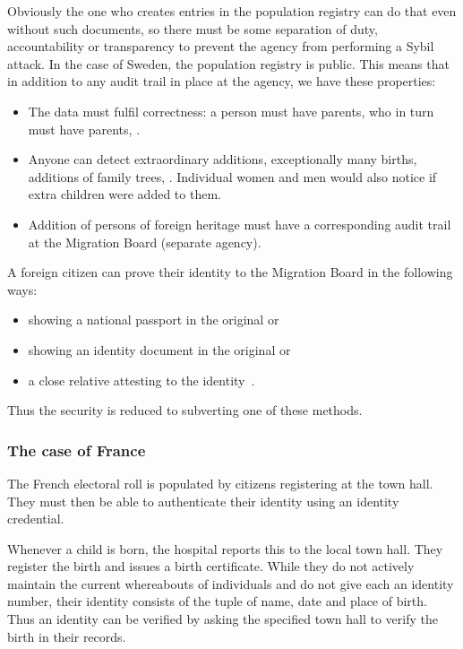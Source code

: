 Obviously the one who creates entries in the population registry can do that 
even without such documents, so there must be some separation of duty, 
accountability or transparency to prevent the agency from performing a Sybil 
attack.
In the case of Sweden, the population registry is public.
This means that in addition to any audit trail in place at the agency, we have 
these properties:
\begin{itemize}
  \item The data must fulfil correctness: a person must have parents, who in 
    turn must have parents, \etc.
  \item Anyone can detect extraordinary additions, \eg exceptionally many 
    births, additions of family trees, \etc.
    Individual women and men would also notice if extra children were added to 
    them.
  \item Addition of persons of foreign heritage must have a corresponding audit 
    trail at the Migration Board (separate agency).
\end{itemize}
A foreign citizen can prove their identity to the Migration Board in the 
following ways:
\begin{itemize}
  \item showing a national passport in the original or
  \item showing an identity document in the original or
  \item a close relative attesting to the 
    identity~\cite{Migrationsverket-ProvenIdentity}.
\end{itemize}
Thus the security is reduced to subverting one of these methods.

\subsubsection{The case of France}

The French electoral roll is populated by citizens registering at the town 
hall.
They must then be able to authenticate their identity using an identity 
credential.

Whenever a child is born, the hospital reports this to the local town hall.
They register the birth and issues a birth certificate.
While they do not actively maintain the current whereabouts of individuals and 
do not give each an identity number, their identity consists of the tuple of 
name, date and place of birth.
Thus an identity can be verified by asking the specified town hall to verify 
the birth in their records.


